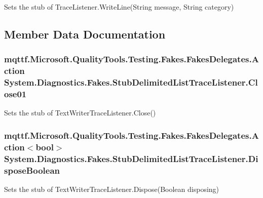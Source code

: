 Sets the stub of Trace\-Listener.\-Write\-Line(\-String message, String category)



\subsection{Member Data Documentation}
\hypertarget{class_system_1_1_diagnostics_1_1_fakes_1_1_stub_delimited_list_trace_listener_a4b89480b561722d86c9af09b8cc14aa9}{
\subsubsection[{Close01}]{\setlength{\rightskip}{0pt plus 5cm}mqttf.\-Microsoft.\-Quality\-Tools.\-Testing.\-Fakes.\-Fakes\-Delegates.\-Action System.\-Diagnostics.\-Fakes.\-Stub\-Delimited\-List\-Trace\-Listener.\-Close01}}\label{class_system_1_1_diagnostics_1_1_fakes_1_1_stub_delimited_list_trace_listener_a4b89480b561722d86c9af09b8cc14aa9}


Sets the stub of Text\-Writer\-Trace\-Listener.\-Close()

\hypertarget{class_system_1_1_diagnostics_1_1_fakes_1_1_stub_delimited_list_trace_listener_ac9a7a71a02c3bcf230041a4fa56b81df}{
\subsubsection[{Dispose\-Boolean}]{\setlength{\rightskip}{0pt plus 5cm}mqttf.\-Microsoft.\-Quality\-Tools.\-Testing.\-Fakes.\-Fakes\-Delegates.\-Action$<$bool$>$ System.\-Diagnostics.\-Fakes.\-Stub\-Delimited\-List\-Trace\-Listener.\-Dispose\-Boolean}}\label{class_system_1_1_diagnostics_1_1_fakes_1_1_stub_delimited_list_trace_listener_ac9a7a71a02c3bcf230041a4fa56b81df}


Sets the stub of Text\-Writer\-Trace\-Listener.\-Dispose(\-Boolean disposing)

